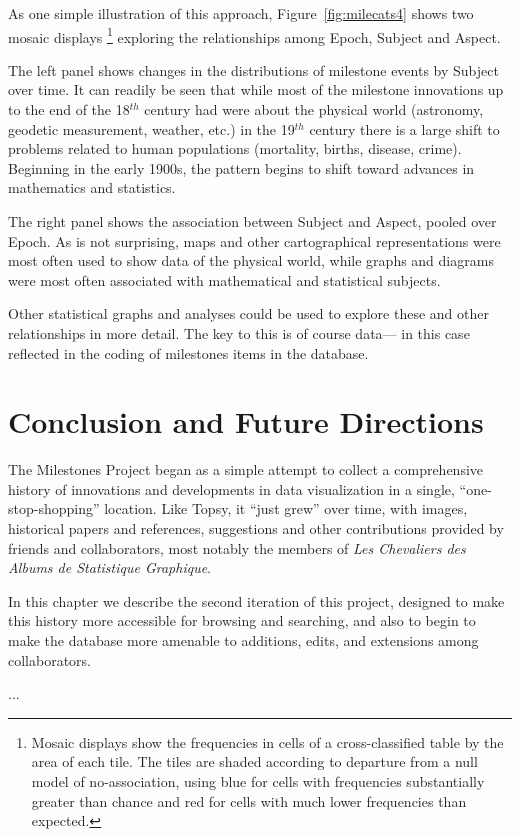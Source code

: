 \documentclass[11pt]{article}
\newcommand*{\figref}[1]{Figure~\ref{#1}}
\newcommand{\Cent}[1]{#1$^{th}$ century}
\begin{document}
As one simple illustration of this approach, \figref{fig:milecats4} shows two mosaic displays%
\footnote{Mosaic displays show the frequencies in cells of a cross-classified table
by the area of each tile.  The tiles are shaded according to departure from a null
model of no-association, using blue for cells with frequencies substantially greater
than chance and red for cells with much lower frequencies than expected.
}
exploring the relationships
among Epoch, Subject and Aspect.

The left panel shows changes in the distributions of milestone events by Subject
over time.  It can readily be seen that while most of the milestone innovations
up to the end of the \Cent{18} had were about the 
physical world (astronomy, geodetic measurement, weather, etc.)
in the \Cent{19} there is a large shift to problems related to human populations
(mortality, births, disease, crime).
Beginning in the early 1900s, the pattern begins to shift toward advances in
mathematics and statistics.

The right panel shows the association between Subject and Aspect, pooled over Epoch.
As is not surprising, maps and other cartographical representations were most often
used to show data of the physical world, while graphs and diagrams were most often 
associated with mathematical and statistical subjects.

Other statistical graphs and analyses could be used to explore these and other
relationships
in more detail. The key to this is of course data--- in this case reflected in the
coding of milestones items in the database.



\section{Conclusion and Future Directions}
The Milestones Project began as a simple attempt to collect a comprehensive history of innovations
and developments in data visualization in a single, ``one-stop-shopping'' location.
Like Topsy, it ``just grew'' over time, with images, historical papers and references,
suggestions and other contributions provided
by friends and collaborators, most notably the members of
\emph{Les Chevaliers des Albums de Statistique Graphique}.

In this chapter we describe the second iteration of this project, designed to make this history
more accessible for browsing and searching, and also to begin to make the database more amenable
to additions, edits, and extensions among collaborators.

...


\end{document}
